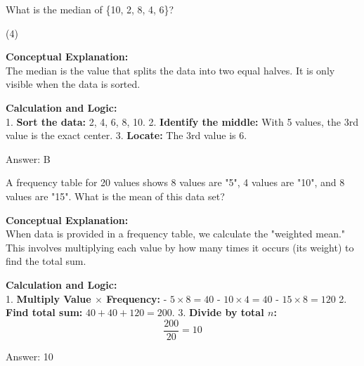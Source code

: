 \documentclass[11pt,paper=a4,answers]{exam}
\begin{document}
\begin{questions}
\vspace{60pt}

\question
What is the median of \{10, 2, 8, 4, 6\}?
\begin{tasks}(4)
\end{tasks}

\begin{solution}
\textbf{Conceptual Explanation:} \\
The median is the value that splits the data into two equal halves. It is only visible when the data is sorted.

\vspace{30pt}

\textbf{Calculation and Logic:} \\
1. \textbf{Sort the data:} 2, 4, 6, 8, 10.
2. \textbf{Identify the middle:} With 5 values, the 3rd value is the exact center.
3. \textbf{Locate:} The 3rd value is 6.

\vspace{30pt}

Answer: \colorbox{yellow!100}{B}
\end{solution}

\vspace{60pt}

\question
A frequency table for 20 values shows 8 values are "5", 4 values are "10", and 8 values are "15". What is the mean of this data set?

\begin{solution}
\textbf{Conceptual Explanation:} \\
When data is provided in a frequency table, we calculate the "weighted mean." This involves multiplying each value by how many times it occurs (its weight) to find the total sum.

\vspace{30pt}

\textbf{Calculation and Logic:} \\
1. \textbf{Multiply Value $\times$ Frequency:}
   - $5 \times 8 = 40$
   - $10 \times 4 = 40$
   - $15 \times 8 = 120$
2. \textbf{Find total sum:} $40 + 40 + 120 = 200$.
3. \textbf{Divide by total $n$:} 
\[ \frac{200}{20} = 10 \]

\vspace{30pt}

Answer: \colorbox{yellow!100}{10}
\end{solution}


\end{questions}
\end{document}
